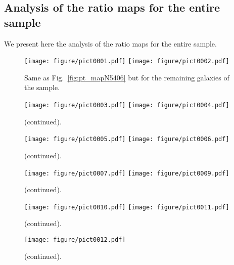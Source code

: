 \documentclass{aa}
\begin{document}
\begin{appendix}


\section{Analysis of the ratio maps for the entire sample}
\label{app2}

We present here the analysis of the ratio maps for the entire sample.

\begin{figure*}
    \centering
    \texttt{[image: figure/pict0001.pdf]}
    \texttt{[image: figure/pict0002.pdf]}
    \caption{Same as Fig.~\ref{fig:pt_mapN5406} but for the remaining galaxies of the sample.}
    \label{fig:pt_map1}
\end{figure*}


\begin{figure*}\ContinuedFloat
    \centering
    \texttt{[image: figure/pict0003.pdf]}
    \texttt{[image: figure/pict0004.pdf]}
    \caption{(continued).}
    \label{fig:pt_map3}
\end{figure*}

\begin{figure*}\ContinuedFloat
    \centering
    \texttt{[image: figure/pict0005.pdf]}
    \texttt{[image: figure/pict0006.pdf]}
    \caption{(continued).}
    \label{fig:pt_map5}
\end{figure*}

\begin{figure*}\ContinuedFloat
    \centering
    \texttt{[image: figure/pict0007.pdf]}
    \texttt{[image: figure/pict0009.pdf]}
    \caption{(continued).}
    \label{fig:pt_map6}
\end{figure*}

\begin{figure*}\ContinuedFloat
    \centering
    \texttt{[image: figure/pict0010.pdf]}
    \texttt{[image: figure/pict0011.pdf]}
    \caption{(continued).}
    \label{fig:pt_map6}
\end{figure*}

\begin{figure*}\ContinuedFloat
    \centering
    \texttt{[image: figure/pict0012.pdf]}
    \caption{(continued).}
    \label{fig:pt_map6}
\end{figure*}


\end{appendix}
\end{document}
